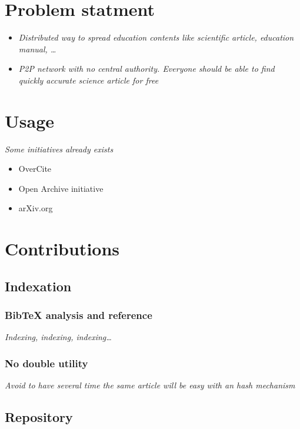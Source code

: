\section{Problem statment}

\begin{itemize}
\item \textit{Distributed way to spread education contents like scientific article, education manual, \ldots}
\item \textit{P2P network with no central authority. Everyone should be able to find quickly accurate science article for free}
\end{itemize}

\section{Usage}

\textit{Some initiatives already exists}

\begin{itemize}
\item OverCite
\item Open Archive initiative
\item arXiv.org
\end{itemize}

\section{Contributions}

\subsection{Indexation}

\subsubsection{Bib\TeX{} analysis and reference}

\textit{Indexing, indexing, indexing\ldots}

\subsubsection{No double utility}

\textit{Avoid to have several time the same article will
be easy with an hash mechanism}

\subsection{Repository}

